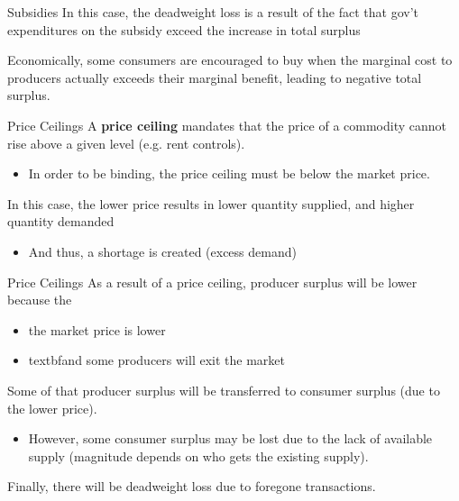 \documentclass[11pt,t]{beamer}
\begin{document}
\begin{frame}{Subsidies}
  In this case, the deadweight loss is a result of the fact that gov't expenditures on the subsidy exceed the increase in total surplus

  \bigskip
  Economically, some consumers are encouraged to buy when the marginal cost to producers actually exceeds their marginal benefit, leading to negative total surplus.
\end{frame}

\begin{frame}{Price Ceilings}
  A \textbf{price ceiling} mandates that the price of a commodity cannot rise above a given level (e.g. rent controls).

  \begin{itemize}
    \item In order to be binding, the price ceiling must be below the market price.
  \end{itemize}

  \bigskip
  In this case, the lower price results in lower quantity supplied, and higher quantity demanded

  \begin{itemize}
    \item And thus, a shortage is created (excess demand)
  \end{itemize}
\end{frame}

\begin{frame}{Price Ceilings}
  As a result of a price ceiling, producer surplus will be lower because the 
  \begin{itemize}
    \item the market price is lower 
    \item textbf{and} some producers will exit the market
  \end{itemize}

  \bigskip
  Some of that producer surplus will be transferred to consumer surplus (due to the lower price).

  \begin{itemize}
    \item However, some consumer surplus may be lost due to the lack of available supply (magnitude depends on who gets the existing supply).
  \end{itemize}

  \bigskip
  Finally, there will be deadweight loss due to foregone transactions.
\end{frame}
\end{document}
